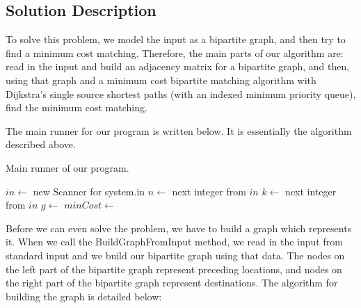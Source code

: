 \documentclass[12pt]{article}
\begin{document}
\subsection{Solution Description}

To solve this problem, we model the input as a bipartite graph, and
then try to find a minimum cost matching. Therefore, the main parts
of our algorithm are: read in the input and build an adjacency matrix
for a bipartite graph, and then, using that graph and a minimum
cost bipartite matching algorithm with Dijkstra's single source
shortest paths (with an indexed minimum priority queue), find the
minimum cost matching.

The main runner for our program is written below. It is essentially
the algorithm described above.

\begin{algorithm}[H]
\caption{Main runner of our program.}
\begin{algorithmic}
        \State $in \gets$ new Scanner for system.in
            \State $n \gets$ next integer from $in$
            \State $k \gets$ next integer from $in$
            \State $g \gets$ 
            \State $minCost \gets$ 
            \State {}
        \EndWhile
    \EndProcedure
\end{algorithmic}
\end{algorithm}

Before we can even solve the problem, we have to build a graph which
represents it. When we call the {\sc BuildGraphFromInput} method,
we read in the input from standard input and we build our bipartite
graph using that data. The nodes on the left part of the bipartite
graph represent preceding locations, and nodes on the right part
of the bipartite graph represent destinations. The algorithm for
building the graph is detailed below:
\end{document}
